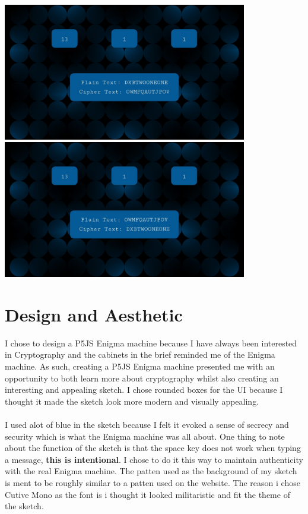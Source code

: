 \documentclass[12pt,a4paper]{article}
\begin{document}
		\begin{center}
			\includegraphics[width=0.8\textwidth]{figures/figure1.jpg}\\
			\vspace{0.5cm}
			\includegraphics[width=0.8\textwidth]{figures/figure2.jpg}\\
		\end{center}
	
	\newpage

	\section{Design and Aesthetic}
		I chose to design a P5JS Enigma machine because I have always been interested 
		in Cryptography and the cabinets in the brief reminded me of the Enigma machine. 
		As such, creating a P5JS Enigma machine presented me with an opportunity to 
		both learn more about cryptography whilst also creating an interesting and appealing 
		sketch. I chose rounded boxes for the UI because I thought it made the sketch look 
		more modern and visually appealing.\\
		\\
		I used alot of blue in the sketch because I felt it evoked a sense of secrecy and 
		security which is what the Enigma machine was all about. One thing to note about the 
		function of the sketch is that the space key does not work when typing a message, 
		\textbf{this is intentional}. I chose to do it this way to maintain authenticity 
		with the real Enigma machine. The patten used as the background of my sketch is ment 
		to be roughly similar to a patten used on the \textcite{ASD2023} website. The reason 
		i chose Cutive Mono as the font is i thought it looked militaristic and fit the 
		theme of the sketch.\\
\end{document}
